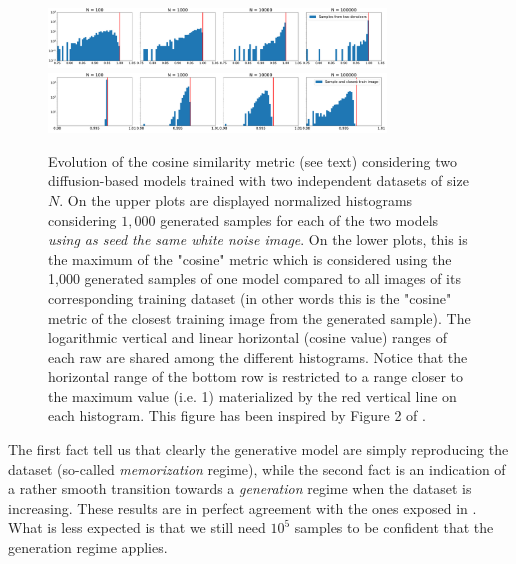 \documentclass[11pt]{amsart}
\begin{document}
\begin{figure}
    \centering
	\includegraphics[width=0.8\textwidth]{fig-diffusion-cosine-AB.pdf}\\
	\includegraphics[width=0.8\textwidth]{fig-diffusion-cosine-ATrain.pdf}
	\caption{Evolution of the cosine similarity metric (see text) considering two diffusion-based models trained with two independent datasets of size $N$. On the upper plots are displayed normalized histograms considering $1,000$ generated samples for each of the two models \textit{using as seed the same white noise image}.  On the lower plots, this is the maximum of the "cosine" metric which is considered using the 1,000 generated samples of one model compared to all images of its corresponding training dataset (in other words this is the "cosine" metric of the closest training image from the generated sample). The logarithmic vertical and linear horizontal (cosine value) ranges of each raw are shared among the different histograms. Notice that the horizontal range of the bottom row is restricted to a range closer to the maximum value (i.e. 1) materialized by the red vertical line on each histogram. This figure has been inspired by Figure 2 of \cite{kadkhodaie2024generalization}.}
	\label{fig-cosine-diffusion}
\end{figure}
%
The first fact tell us that clearly the generative model are simply reproducing the dataset (so-called \textit{memorization} regime), while the second fact is an indication of a rather smooth transition towards a \textit{generation} regime when the dataset is increasing. These results are in perfect agreement with the ones exposed in \cite{kadkhodaie2024generalization}. What is less expected is that we still need $10^5$ samples to be confident that the generation regime applies. 
\end{document}
